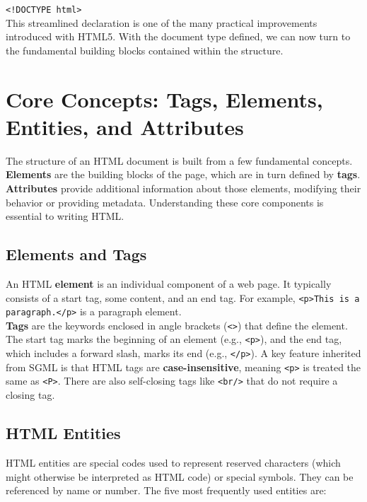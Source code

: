 \documentclass{scrbook}
\begin{document}
\texttt{<!DOCTYPE html>} \\

This streamlined declaration is one of the many practical improvements introduced with HTML5. With the document type defined, we can now turn to the fundamental building blocks contained within the structure.

\chapter{Core Concepts: Tags, Elements, Entities, and Attributes}

The structure of an HTML document is built from a few fundamental concepts. \textbf{Elements} are the building blocks of the page, which are in turn defined by \textbf{tags}. \textbf{Attributes} provide additional information about those elements, modifying their behavior or providing metadata. Understanding these core components is essential to writing HTML.

\section{ Elements and Tags}

An HTML \textbf{element} is an individual component of a web page. It typically consists of a start tag, some content, and an end tag. For example, \texttt{<p>This is a paragraph.</p>} is a paragraph element. \\

\textbf{Tags} are the keywords enclosed in angle brackets (\texttt{<>}) that define the element. The start tag marks the beginning of an element (e.g., \texttt{<p>}), and the end tag, which includes a forward slash, marks its end (e.g., \texttt{</p>}). A key feature inherited from SGML is that HTML tags are \textbf{case-insensitive}, meaning \texttt{<p>} is treated the same as \texttt{<P>}. There are also self-closing tags like \texttt{<br/>} that do not require a closing tag.

\section{HTML Entities}

HTML entities are special codes used to represent reserved characters (which might otherwise be interpreted as HTML code) or special symbols. They can be referenced by name or number. The five most frequently used entities are:
\end{document}
